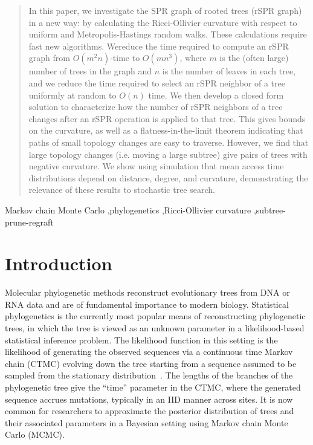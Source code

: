 \documentclass[]{elsarticle}
\begin{document}
\begin{frontmatter}
\begin{abstract}
In this paper, we investigate the SPR graph of rooted trees (rSPR graph) in a new way: by calculating the Ricci-Ollivier curvature with respect to uniform and Metropolis-Hastings random walks.
These calculations require fast new algorithms.
Wereduce the time required to compute an rSPR graph from $O(m^2n)$-time to $O(mn^3)$, where $m$ is the (often large) number of trees in the graph and $n$ is the number of leaves in each tree, and we reduce the time required to select an rSPR neighbor of a tree uniformly at random to $O(n)$ time.
We then develop a closed form solution to characterize how the number of rSPR neighbors of a tree changes after an rSPR operation is applied to that tree.
This gives bounds on the curvature, as well as a flatness-in-the-limit theorem indicating that paths of small topology changes are easy to traverse.
However, we find that large topology changes (i.e. moving a large subtree) give pairs of trees with negative curvature.
We show using simulation that mean access time distributions depend on distance, degree, and curvature, demonstrating the relevance of these results to stochastic tree search.
\end{abstract}

\begin{keyword}
Markov chain Monte Carlo \sep phylogenetics \sep Ricci-Ollivier curvature \sep subtree-prune-regraft
\end{keyword}

\end{frontmatter}



\section{Introduction}
Molecular phylogenetic methods reconstruct evolutionary trees from DNA or RNA data and are of fundamental importance to modern biology.
Statistical phylogenetics is the currently most popular means of reconstructing phylogenetic trees, in which the tree is viewed as an unknown parameter in a likelihood-based statistical inference problem.
The likelihood function in this setting is the likelihood of generating the observed sequences via a continuous time Markov chain (CTMC) evolving down the tree starting from a sequence assumed to be sampled from the stationary distribution~\citep{felsenstein1981evolutionary}.
The lengths of the branches of the phylogenetic tree give the ``time'' parameter in the CTMC, where the generated sequence accrues mutations, typically in an IID manner across sites.
It is now common for researchers to approximate the posterior distribution of trees and their associated parameters in a Bayesian setting using Markov chain Monte Carlo (MCMC).
\end{document}
